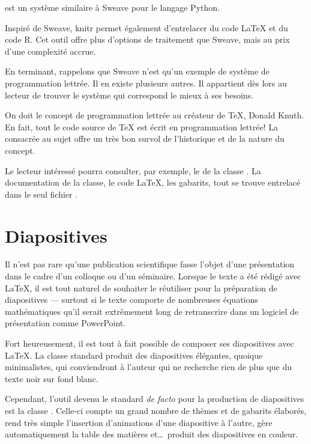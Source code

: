  est un système similaire à
Sweave pour le langage Python.

Inspiré de Sweave, knitr \citep{knitr} permet également d'entrelacer
du code {\LaTeX} et du code R. Cet outil offre plus d'options de
traitement que Sweave, mais au prix d'une complexité accrue.

En terminant, rappelons que Sweave n'est qu'un exemple de système de
programmation lettrée. Il en existe plusieurs autres. Il appartient
dès lors au lecteur de trouver le système qui correspond le mieux à
ses besoins.

\begin{information}
  On doit le concept de programmation lettrée au créateur de {\TeX},
  Donald Knuth.  En fait, tout le code source de {\TeX} est écrit
  en programmation lettrée! La %
  consacrée au sujet offre un très bon survol de l'historique et de la
  nature du concept.

  Le lecteur intéressé pourra consulter, par exemple, le %
  de la classe . La documentation de la classe, le
  code {\LaTeX}, les gabarits, tout se trouve entrelacé
  dans le seul fichier .
\end{information}


\section{Diapositives}
\label{sec:trucs:diapositives}

Il n'est pas rare qu'une publication scientifique fasse l'objet d'une
présentation dans le cadre d'un colloque ou d'un séminaire. Lorsque le
texte a été rédigé avec {\LaTeX}, il est tout naturel de souhaiter le
réutiliser pour la préparation de diapositives --- surtout si le texte
comporte de nombreuses équations mathématiques qu'il serait
extrêmement long de retranscrire dans un logiciel de présentation
comme PowerPoint.

Fort heureusement, il est tout à fait possible de composer ses
diapositives avec {\LaTeX}. La classe standard  produit
des diapositives élégantes, quoique minimalistes, qui conviendront à
l'auteur qui ne recherche rien de plus que du texte noir sur fond
blanc.

Cependant, l'outil devenu le standard \emph{de facto} pour la
production de diapositives est la classe 
\citep{beamer}. Celle-ci compte un grand nombre de thèmes et de
gabarits élaborés, rend très simple l'insertion d'animations d'une
diapositive à l'autre, gère automatiquement la table des matières
et\dots\ produit des diapositives en couleur.


